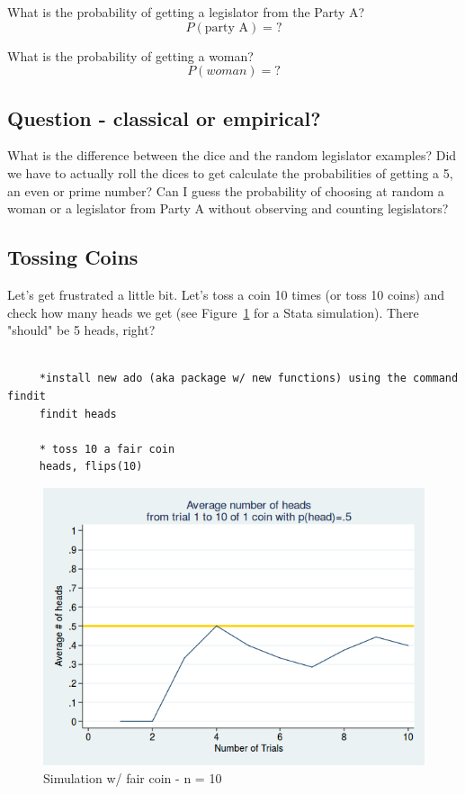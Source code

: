 \documentclass[11pt]{article}
\begin{document}
	What is the probability of getting a legislator from the Party A?
	\[P(\text{party A}) = ?\]
	
	What is the probability of getting a woman?
	\[P(woman) = ?\]

	\subsection*{Question - classical or empirical?}

	What is the difference between the dice and the random legislator examples? Did we have to actually roll the dices to get calculate the probabilities of getting a 5, an even or prime number? Can I guess the probability of choosing at random a woman or a legislator from Party A without observing and counting legislators?\\

	\subsection*{Tossing Coins}

	Let's get frustrated a little bit. Let's toss a coin 10 times (or toss 10 coins) and check how many heads we get (see Figure~\ref{f1} for a Stata simulation). There "should" be 5 heads, right?\\


		\begin{verbatim}

	 *install new ado (aka package w/ new functions) using the command findit
	 findit heads

	 * toss 10 a fair coin
	 heads, flips(10)
	\end{verbatim}


\begin{figure}[htp]
\centering
\includegraphics[scale=0.50]{coin_sim_10_fair.png}
\caption{Simulation w/ fair coin - n = 10}
\label{f1}
\end{figure}
\end{document}
